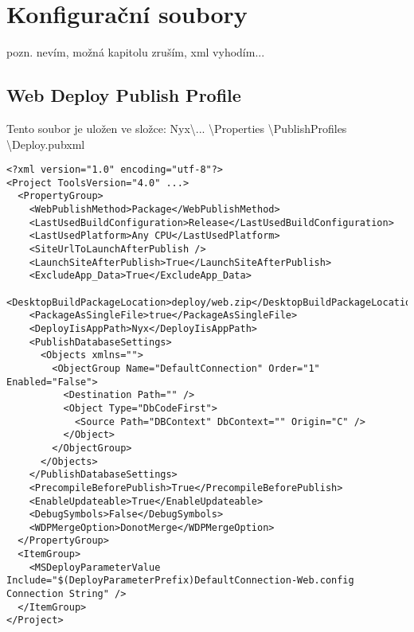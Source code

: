 
\chapter{Konfigurační soubory}
pozn. nevím, možná kapitolu zruším, xml vyhodím...

\section{Web Deploy Publish Profile}
\label{ch:publishProfile}
Tento soubor je uložen ve složce: Nyx\textbackslash ... \textbackslash Properties \textbackslash PublishProfiles \textbackslash Deploy.pubxml

\begin{lstlisting}[style=XML]
<?xml version="1.0" encoding="utf-8"?>
<Project ToolsVersion="4.0" ...>
  <PropertyGroup>
    <WebPublishMethod>Package</WebPublishMethod>
    <LastUsedBuildConfiguration>Release</LastUsedBuildConfiguration>
    <LastUsedPlatform>Any CPU</LastUsedPlatform>
    <SiteUrlToLaunchAfterPublish />
    <LaunchSiteAfterPublish>True</LaunchSiteAfterPublish>
    <ExcludeApp_Data>True</ExcludeApp_Data>
    <DesktopBuildPackageLocation>deploy/web.zip</DesktopBuildPackageLocation>
    <PackageAsSingleFile>true</PackageAsSingleFile>
    <DeployIisAppPath>Nyx</DeployIisAppPath>
    <PublishDatabaseSettings>
      <Objects xmlns="">
        <ObjectGroup Name="DefaultConnection" Order="1" Enabled="False">
          <Destination Path="" />
          <Object Type="DbCodeFirst">
            <Source Path="DBContext" DbContext="" Origin="C" />
          </Object>
        </ObjectGroup>
      </Objects>
    </PublishDatabaseSettings>
    <PrecompileBeforePublish>True</PrecompileBeforePublish>
    <EnableUpdateable>True</EnableUpdateable>
    <DebugSymbols>False</DebugSymbols>
    <WDPMergeOption>DonotMerge</WDPMergeOption>
  </PropertyGroup>
  <ItemGroup>
    <MSDeployParameterValue Include="$(DeployParameterPrefix)DefaultConnection-Web.config Connection String" />
  </ItemGroup>
</Project>
\end{lstlisting}

